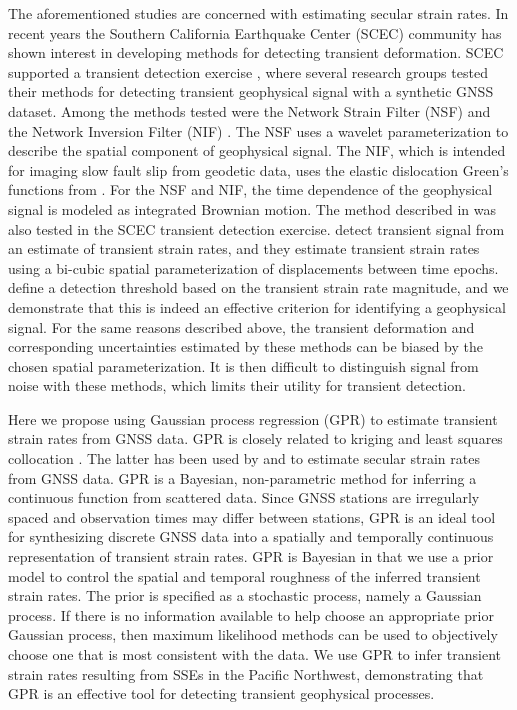 \documentclass[extra,mreferee]{gji}
\begin{document}
The aforementioned studies are concerned with estimating secular
strain rates. In recent years the Southern California Earthquake
Center (SCEC) community has shown interest in developing methods for
detecting transient deformation. SCEC supported a transient detection
exercise \citep{Lohman2013}, where several research groups tested
their methods for detecting transient geophysical signal with a
synthetic GNSS dataset. Among the methods tested were the Network
Strain Filter (NSF) \citep{Ohtani2010} and the Network Inversion
Filter (NIF) \citep{Segall1997}. The NSF uses a wavelet
parameterization to describe the spatial component of geophysical
signal. The NIF, which is intended for imaging slow fault slip from
geodetic data, uses the elastic dislocation Green's functions from
\citet{Okada1992}. For the NSF and NIF, the time dependence of the
geophysical signal is modeled as integrated Brownian motion. The
method described in \citet{Holt2013} was also tested in the SCEC
transient detection exercise. \citet{Holt2013} detect transient signal
from an estimate of transient strain rates, and they estimate
transient strain rates using a bi-cubic spatial parameterization of
displacements between time epochs. \citet{Holt2013} define a detection
threshold based on the transient strain rate magnitude, and we
demonstrate that this is indeed an effective criterion for identifying
a geophysical signal. For the same reasons described above, the
transient deformation and corresponding uncertainties estimated by
these methods can be biased by the chosen spatial parameterization. It
is then difficult to distinguish signal from noise with these methods,
which limits their utility for transient detection.


Here we propose using Gaussian process regression (GPR)
\citep{Rasmussen2006} to estimate transient strain rates from GNSS
data. GPR is closely related to kriging \citep{Cressie1992} and least
squares collocation \citep{Moritz1978}. The latter has been used by
\citet{Kato1998} and \citet{El-Fiky1999} to estimate secular strain
rates from GNSS data. GPR is a Bayesian, non-parametric method for
inferring a continuous function from scattered data. Since GNSS
stations are irregularly spaced and observation times may differ
between stations, GPR is an ideal tool for synthesizing discrete GNSS
data into a spatially and temporally continuous representation of
transient strain rates. GPR is Bayesian in that we use a prior model
to control the spatial and temporal roughness of the inferred
transient strain rates. The prior is specified as a stochastic
process, namely a Gaussian process. If there is no information
available to help choose an appropriate prior Gaussian process, then
maximum likelihood methods can be used to objectively choose one that
is most consistent with the data. We use GPR to infer transient strain
rates resulting from SSEs in the Pacific Northwest, demonstrating that
GPR is an effective tool for detecting transient geophysical
processes.
\end{document}
